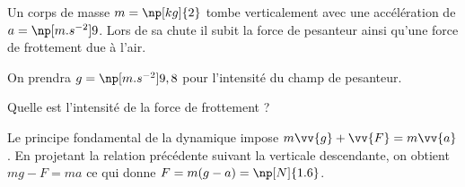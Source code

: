 
\finEntrainement










\hauteurLargeurCadreReponse		{6mm}{3cm}
\initialisationEntrainement

Un corps de masse $m=\np[kg]{2}$ tombe verticalement avec une accélération de $a= \np[m.s^{-2}]{9}$. Lors de sa chute il subit la force de pesanteur ainsi qu'une force de frottement due à l'air.

On prendra $g=\np[m.s^{-2}]{9,8}$ pour l'intensité du champ de pesanteur.

\debutEntrainement


\begin{enonce}
Quelle est l'intensité de la force de frottement ?	 
\end{enonce}


\begin{corrige}
	Le principe fondamental de la dynamique impose $m\vv{g}+\vv{F}=m \vv{a}$. En projetant la relation précédente suivant la verticale descendante, on obtient $mg-F=ma$ ce qui donne $F=m(g-a)=\np[N]{1.6}$. 
\end{corrige}

